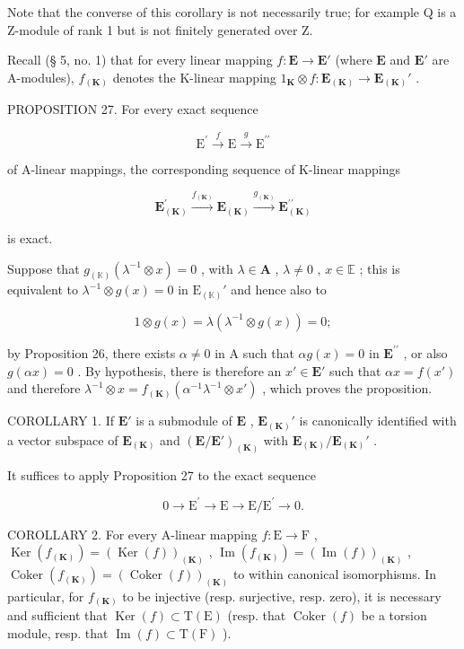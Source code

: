 Note that the converse of this corollary is not necessarily true; for example Q is a Z-module of rank 1 but is not finitely generated over Z.

Recall (§ 5, no. 1) that for every linear mapping \(f: \mathbf{E} \to \mathbf{E}'\) (where \(\mathbf{E}\) and \(\mathbf{E}'\) are A-modules), \(f_{(\mathbf{K})}\) denotes the K-linear mapping \(1_{\mathbf{K}} \otimes f: \mathbf{E}_{(\mathbf{K})} \to \mathbf{E}_{(\mathbf{K})}'\) .

PROPOSITION 27. For every exact sequence

\[
\mathrm{E} ^ {\prime} \xrightarrow {f} \mathrm{E} \xrightarrow {g} \mathrm{E} ^ {\prime \prime}
\]

of A-linear mappings, the corresponding sequence of K-linear mappings

\[
\mathbf {E} _ {(\mathbf {K})} ^ {\prime} \xrightarrow {f _ {(\mathbf {K})}} \mathbf {E} _ {(\mathbf {K})} \xrightarrow {g _ {(\mathbf {K})}} \mathbf {E} _ {(\mathbf {K})} ^ {\prime \prime}
\]

is exact.

Suppose that \(g_{(\mathbb{K})}(\lambda^{-1} \otimes x) = 0\) , with \(\lambda \in \mathbf{A}\) , \(\lambda \neq 0\) , \(x \in \mathbb{E}\) ; this is equivalent to \(\lambda^{-1} \otimes g(x) = 0\) in \(\mathrm{E}_{(\mathbb{K})}'\) and hence also to

\[
1 \otimes g (x) = \lambda (\lambda^ {- 1} \otimes g (x)) = 0;
\]

by Proposition 26, there exists \(\alpha \neq 0\) in A such that \(\alpha g(x) = 0\) in \(\mathbf{E}^{\prime \prime}\) , or also \(g(\alpha x) = 0\) . By hypothesis, there is therefore an \(x' \in \mathbf{E}'\) such that \(\alpha x = f(x')\) and therefore \(\lambda^{-1} \otimes x = f_{(\mathbf{K})}(\alpha^{-1}\lambda^{-1} \otimes x')\) , which proves the proposition.

COROLLARY 1. If \(\mathbf{E}'\) is a submodule of \(\mathbf{E}\) , \(\mathbf{E}_{(\mathbf{K})}'\) is canonically identified with a vector subspace of \(\mathbf{E}_{(\mathbf{K})}\) and \((\mathbf{E} / \mathbf{E}')_{(\mathbf{K})}\) with \(\mathbf{E}_{(\mathbf{K})} / \mathbf{E}_{(\mathbf{K})}'\) .

It suffices to apply Proposition 27 to the exact sequence

\[
0 \rightarrow \mathrm{E} ^ {\prime} \rightarrow \mathrm{E} \rightarrow \mathrm{E} / \mathrm{E} ^ {\prime} \rightarrow 0.
\]

COROLLARY 2. For every A-linear mapping \(f: \mathrm{E} \to \mathrm{F}\) , \(\operatorname{Ker}(f_{(\mathbf{K})}) = (\operatorname{Ker}(f))_{(\mathbf{K})}\) , \(\operatorname{Im}(f_{(\mathbf{K})}) = (\operatorname{Im}(f))_{(\mathbf{K})}\) , \(\operatorname{Coker}(f_{(\mathbf{K})}) = (\operatorname{Coker}(f))_{(\mathbf{K})}\) to within canonical isomorphisms. In particular, for \(f_{(\mathbf{K})}\) to be injective (resp. surjective, resp. zero), it is necessary and sufficient that \(\operatorname{Ker}(f) \subset \mathrm{T}(\mathrm{E})\) (resp. that \(\operatorname{Coker}(f)\) be a torsion module, resp. that \(\operatorname{Im}(f) \subset \mathrm{T}(\mathrm{F})\) ).

